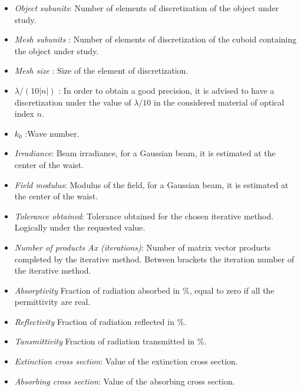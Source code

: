 \begin{itemize}

\item {\it Object subunits}: Number of elements of discretization of
  the  object under study.

\item {\it Mesh subunits} : Number of elements of discretization of
  the cuboid containing the object under study.

\item {\it Mesh size} : Size of the element of discretization.

\item $\lambda/(10|n|)$ : In order to obtain a good precision, it is
  advised to have a discretization under the value of $\lambda/10$ in
  the considered material of optical index $n$.

\item $k_0$ :Wave number.

\item {\it Irradiance}: Beam irradiance, for a Gaussian beam, it is
  estimated at the center of the waist.

\item {\it Field modulus}: Modulus of the field, for a Gaussian beam, it is 
estimated at the center of the waist.

\item {\it Tolerance obtained}: Tolerance obtained for the chosen iterative 
method. Logically under the requested value.

\item {\it Number of products Ax (iterations)}: Number of matrix
  vector products completed by the iterative method. Between brackets
  the iteration number of the iterative method.

\item {\it Absorptivity} Fraction of radiation absorbed in \%, equal
  to zero if all the permittivity are real.

\item {\it Reflectivity} Fraction of radiation reflected in \%.

  \item {\it Tansmittivity} Fraction of radiation transmitted in \%.

  
\item {\it Extinction cross section}: Value of the extinction cross
  section.

\item {\it Absorbing cross section}: Value of the absorbing cross
  section.


\end{itemize}
